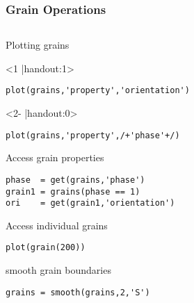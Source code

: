 \documentclass[compress]{beamer}
\begin{document}
\begin{frame}[fragile]
  \frametitle{Grain Operations}

  \begin{columns}
    \begin{column}{8.5cm}

      Plotting grains
      \begin{onlyenv}<1 |handout:1>
\begin{lstlisting}
plot(grains,'property','orientation')
\end{lstlisting}
      \end{onlyenv}

      \begin{onlyenv}<2- |handout:0>
\begin{lstlisting}
plot(grains,'property',/+'phase'+/)
\end{lstlisting}
      \end{onlyenv}

      \pause
      \pause

\bigskip

      Access grain properties
\begin{lstlisting}
phase  = get(grains,'phase')
grain1 = grains(phase == 1)
ori    = get(grain1,'orientation')
\end{lstlisting}

\pause

\bigskip

Access individual grains
\begin{lstlisting}
plot(grain(200))
\end{lstlisting}

\pause
\bigskip

smooth grain boundaries
\begin{lstlisting}
grains = smooth(grains,2,'S')
\end{lstlisting}




    \end{column}
    \begin{column}{3.5cm}
    \end{column}
  \end{columns}

\end{frame}
\end{document}
